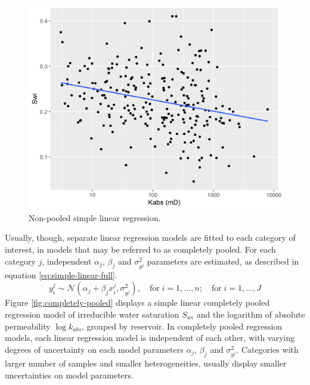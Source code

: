 \documentclass[english,msc,numbers]{coppe}
\begin{document}
  \begin{figure}
  
  {\centering \includegraphics[width=0.9\linewidth]{figure/4-6-simple-regression} 
  
  }
  
  \caption{Non-pooled simple linear regression.}\label{fig:non-pooled}
  \end{figure}
  Usually, though, separate linear regression models are fitted to each category of interest, in models that may be referred to as completely pooled. For each category \(j\), independent \(\alpha_j\), \(\beta_j\) and \(\sigma_{y^j}^2\) parameters are estimated, as described in equation \eqref{eq:simple-linear-full}.
  \begin{equation} 
    y_i^j \sim \mathcal{N}(\alpha_j + \beta_j x_i^j, \sigma_{y^j}^2),\quad \text{for}\; i=1,...,n; \quad \text{for} \; i=1,...,J
    \label{eq:simple-linear-full}
  \end{equation}
  Figure \ref{fig:completely-pooled} displays a simple linear completely pooled regression model of irreducible water saturation \(S_{wi}\) and the logarithm of absolute permeability \(\log{k_{abs}}\), grouped by reservoir. In completely pooled regression models, each linear regression model is independent of each other, with varying degrees of uncertainty on each model parameters \(\alpha_j\), \(\beta_j\) and \(\sigma_{y^j}^2\). Categories with larger number of samples and smaller heterogeneities, usually display smaller uncertainties on model parameters.
\end{document}
